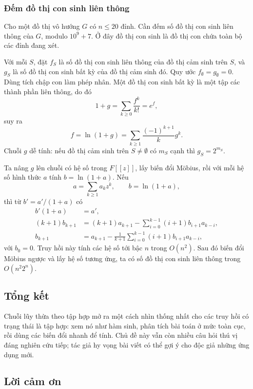 \documentclass[11pt]{article}
\begin{document}
\subsubsection{Đếm đồ thị con sinh liên thông}

Cho một đồ thị vô hướng \(G\) có \(n\le 20\) đỉnh. Cần đếm số đồ thị con sinh
liên thông của \(G\), modulo \(10^9+7\). Ở đây đồ thị con sinh là đồ thị con
chứa toàn bộ các đỉnh đang xét.

Với mỗi \(S\), đặt \(f_S\) là số đồ thị con sinh liên thông của đồ thị cảm sinh
trên \(S\), và \(g_S\) là số đồ thị con sinh bất kỳ của đồ thị cảm sinh đó.
Quy ước \(f_\emptyset=g_\emptyset=0\). Dùng tích chập con làm phép nhân. Một đồ
thị con sinh bất kỳ là một tập các thành phần liên thông, do đó
\[
  1+g=\sum_{k\ge 0}\frac{f^k}{k!}=e^f,
\]
suy ra
\[
  f=\ln(1+g)=\sum_{k\ge 1}\frac{(-1)^{k+1}}{k}g^k.
\]
Chuỗi \(g\) dễ tính: nếu đồ thị cảm sinh trên \(S\ne\emptyset\) có \(m_S\)
cạnh thì \(g_S=2^{m_S}\).

Ta nâng \(g\) lên chuỗi có hệ số trong \(F[[z]]\), lấy biến đổi Möbius, rồi với
mỗi hệ số hình thức \(a\) tính \(b=\ln(1+a)\). Nếu
\[
  a=\sum_{k\ge 1}a_kz^k,\qquad b=\ln(1+a),
\]
thì từ \(b'=a'/(1+a)\) có
\[
\begin{aligned}
  b'(1+a)&=a',\\
  (k+1)b_{k+1}
  &=(k+1)a_{k+1}
    -\sum_{i=0}^{k-1}(i+1)b_{i+1}a_{k-i},\\
  b_{k+1}
  &=a_{k+1}
    -\frac{1}{k+1}\sum_{i=0}^{k-1}(i+1)b_{i+1}a_{k-i},
\end{aligned}
\]
với \(b_0=0\). Truy hồi này tính các hệ số tới bậc \(n\) trong \(O(n^2)\). Sau
đó biến đổi Möbius ngược và lấy hệ số tương ứng, ta có số đồ thị con sinh liên
thông trong \(O(n^2 2^n)\).

\subsection{Tổng kết}

Chuỗi lũy thừa theo tập hợp mở ra một cách nhìn thống nhất cho các truy hồi có
trạng thái là tập hợp: xem nó như hàm sinh, phân tích bài toán ở mức toàn cục,
rồi dùng các biến đổi nhanh để tính. Chủ đề này vẫn còn nhiều câu hỏi thú vị
đáng nghiên cứu tiếp; tác giả hy vọng bài viết có thể gợi ý cho độc giả những
ứng dụng mới.

\subsection{Lời cảm ơn}
\end{document}
